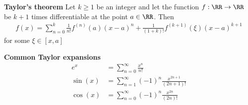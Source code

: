 \textbf{Taylor's theorem} \newline
Let \(k\geq1\) be an integer and let the function \(f:\RR \rightarrow \RR\) be \(k+1\) times differentiable at the point \(a\in\RR\). Then
\begin{align*}
    f(x) = \sum_{n=0}^{k}\frac{1}{n!}f^{(n)}(a)(x-a)^n + \frac{1}{(1+k)!}f^{(k+1)}(\xi)(x-a)^{k+1}
\end{align*}
for some \(\xi\in[x,a]\)


\textbf{Common Taylor expansions}
\begin{align*}
    e^x &= \sum_{n=0}^{\infty}\frac{x^n}{n!} \\
    \sin(x) &= \sum_{n=1}^{\infty}(-1)^n\frac{x^{2n+1}}{(2n+1)!} \\
    \cos(x) &= \sum_{n=0}^{\infty}(-1)^n\frac{x^{2n}}{(2n)!} \\
\end{align*}

